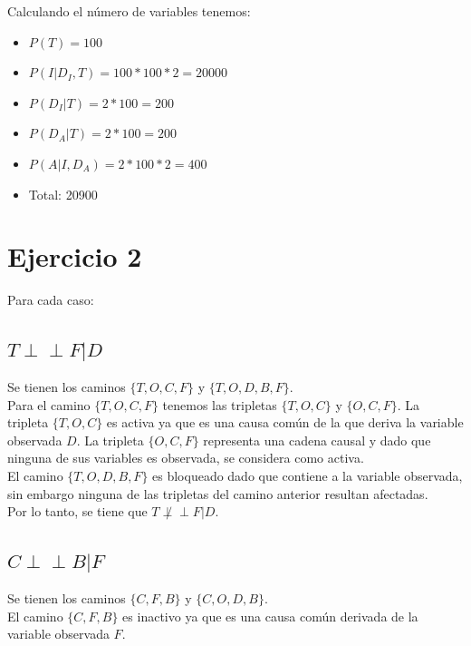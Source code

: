 \documentclass[letterpaper,12pt]{article}
\theoremstyle{definition}
\begin{document}
Calculando el número de variables tenemos:

\begin{itemize}
	\item \(P(T) = 100\)
	\item \(P(I|D_I,T) = 100 * 100 * 2 = 20000\)
	\item \(P(D_I|T) = 2 * 100 = 200\)
	\item \(P(D_A|T) = 2 * 100 = 200\)
	\item \(P(A|I,D_A) = 2 * 100 * 2 = 400\)
	\item Total: 20900
\end{itemize}


\section*{Ejercicio 2}

Para cada caso:

\subsection*{\(T  \perp\!\!\!\perp F | D\)}

Se tienen los caminos \(\{T,O,C,F\}\) y  \(\{T,O,D,B,F\}\).\\

Para el camino \(\{T,O,C,F\}\) tenemos las tripletas  \(\{T,O,C\}\) y \(\{O,C,F\}\). La tripleta \(\{T,O,C\}\) es activa ya que es una causa común de la que deriva la variable observada \(D\). La tripleta \(\{O,C,F\}\) representa una cadena causal y dado que ninguna de sus variables es observada, se considera como activa. \\

El camino  \(\{T,O,D,B,F\}\) es bloqueado dado que contiene a la variable observada, sin embargo ninguna de las tripletas del camino anterior resultan afectadas. \\

Por lo tanto, se tiene que \(T  \not\perp\!\!\!\perp F | D\).

\subsection*{\(C  \perp\!\!\!\perp B | F\)}

Se tienen los caminos \(\{C,F,B\}\) y \(\{C,O,D,B\}\).\\

El camino  \(\{C,F,B\}\) es inactivo ya que es una causa común derivada de la variable observada \(F\).\\
\end{document}
